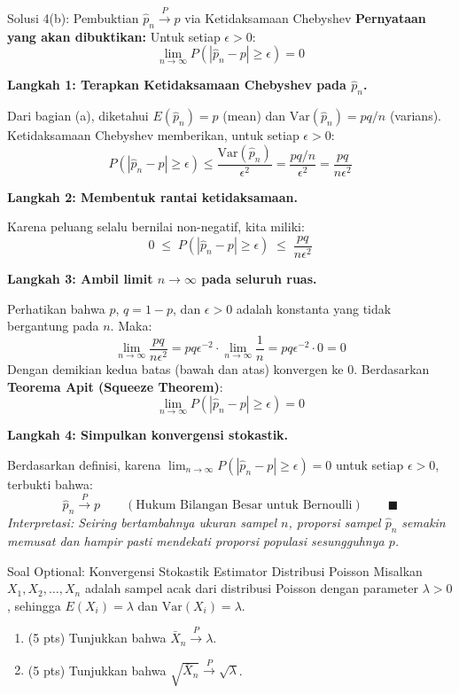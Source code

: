\documentclass[10pt,twoside]{article}
\begin{document}
\begin{solbox}{Solusi 4(b): Pembuktian $\hat{p}_n \xrightarrow{P} p$ via Ketidaksamaan Chebyshev}
\textbf{Pernyataan yang akan dibuktikan:}
Untuk setiap $\epsilon > 0$:
\[
\lim_{n \to \infty} P(|\hat{p}_n - p| \ge \epsilon) = 0
\]

\textbf{Langkah 1: Terapkan Ketidaksamaan Chebyshev pada $\hat{p}_n$.}

Dari bagian (a), diketahui $E(\hat{p}_n) = p$ (mean) dan $\mathrm{Var}(\hat{p}_n) = pq/n$ (varians). Ketidaksamaan Chebyshev memberikan, untuk setiap $\epsilon > 0$:
\[
P(|\hat{p}_n - p| \ge \epsilon) \le \frac{\mathrm{Var}(\hat{p}_n)}{\epsilon^2} = \frac{pq/n}{\epsilon^2} = \frac{pq}{n\epsilon^2}
\]

\textbf{Langkah 2: Membentuk rantai ketidaksamaan.}

Karena peluang selalu bernilai non-negatif, kita miliki:
\[
0 \;\le\; P\!\left(|\hat{p}_n - p| \ge \epsilon\right) \;\le\; \frac{pq}{n\epsilon^2}
\]

\textbf{Langkah 3: Ambil limit $n \to \infty$ pada seluruh ruas.}

Perhatikan bahwa $p$, $q = 1-p$, dan $\epsilon > 0$ adalah konstanta yang tidak bergantung pada $n$. Maka:
\[
\lim_{n \to \infty} \frac{pq}{n\epsilon^2} = pq\epsilon^{-2} \cdot \lim_{n \to \infty} \frac{1}{n} = pq\epsilon^{-2} \cdot 0 = 0
\]
Dengan demikian kedua batas (bawah dan atas) konvergen ke 0. Berdasarkan \textbf{Teorema Apit (Squeeze Theorem)}:
\[
\lim_{n \to \infty} P\!\left(|\hat{p}_n - p| \ge \epsilon\right) = 0
\]

\textbf{Langkah 4: Simpulkan konvergensi stokastik.}

Berdasarkan definisi, karena $\lim_{n \to \infty} P(|\hat{p}_n - p| \ge \epsilon) = 0$ untuk setiap $\epsilon > 0$, terbukti bahwa:
\[
\boxed{\hat{p}_n \xrightarrow{P} p \qquad (\text{Hukum Bilangan Besar untuk Bernoulli})} \qquad \blacksquare
\]
\textit{Interpretasi: Seiring bertambahnya ukuran sampel $n$, proporsi sampel $\hat{p}_n$ semakin memusat dan hampir pasti mendekati proporsi populasi sesungguhnya $p$.}
\end{solbox}

\begin{soalbox}{Soal Optional: Konvergensi Stokastik Estimator Distribusi Poisson}
Misalkan $X_1, X_2, \dots, X_n$ adalah sampel acak dari distribusi Poisson dengan parameter $\lambda > 0$, sehingga $E(X_i) = \lambda$ dan $\mathrm{Var}(X_i) = \lambda$.
\begin{enumerate}
  \item (5 pts) Tunjukkan bahwa $\bar{X}_n \xrightarrow{P} \lambda$.
  \item (5 pts) Tunjukkan bahwa $\sqrt{\bar{X}_n} \xrightarrow{P} \sqrt{\lambda}$.
\end{enumerate}
\end{soalbox}
\end{document}
